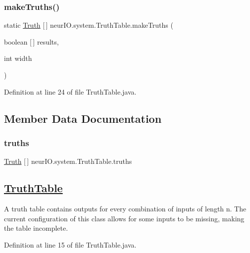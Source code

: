 \subsubsection{\texorpdfstring{make\+Truths()}{makeTruths()}}
{\footnotesize\ttfamily static \hyperlink{classneur_i_o_1_1system_1_1_truth}{Truth} \mbox{[}$\,$\mbox{]} neur\+I\+O.\+system.\+Truth\+Table.\+make\+Truths (\begin{DoxyParamCaption}\item[{boolean \mbox{[}$\,$\mbox{]}}]{results,  }\item[{int}]{width }\end{DoxyParamCaption})\hspace{0.3cm}{\ttfamily [static]}}



Definition at line 24 of file Truth\+Table.\+java.



\subsection{Member Data Documentation}
\mbox{\label{classneur_i_o_1_1system_1_1_truth_table_aa8cdabf1eb334fc405d50b9249e42ae4}} 
\subsubsection{\texorpdfstring{truths}{truths}}
{\footnotesize\ttfamily \hyperlink{classneur_i_o_1_1system_1_1_truth}{Truth} \mbox{[}$\,$\mbox{]} neur\+I\+O.\+system.\+Truth\+Table.\+truths}

\subsection*{\hyperlink{classneur_i_o_1_1system_1_1_truth_table}{Truth\+Table} }

A truth table contains outputs for every combination of inputs of length n. The current configuration of this class allows for some inputs to be missing, making the table incomplete. 

Definition at line 15 of file Truth\+Table.\+java.

\mbox{\label{classneur_i_o_1_1system_1_1_truth_table_a71a416200e01a326bad83c9509cca9f1}} 
